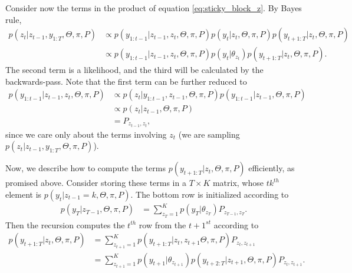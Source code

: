 \documentclass{article}
\begin{document}
Consider now the terms in the product of equation \ref{eq:sticky_block_z}. By
Bayes rule,
\begin{align*}
  p\left(z_{t} \vert z_{t - 1}, y_{1:T}, \Theta, \pi, P\right) &\propto p\left(y_{1:t - 1} \vert z_{t - 1}, z_{t}, \Theta, \pi, P\right)
  p\left(y_{t} \vert z_{t}, \Theta, \pi, P\right)
  p\left(y_{t + 1 : T} \vert z_{t}, \Theta, \pi, P\right) \\
  &\propto p\left(y_{1:t - 1} \vert z_{t - 1}, z_t, \Theta, \pi, P\right) p\left(y_t \vert \theta_{z_t}\right) p\left(y_{t + 1 : T}\vert z_{t}, \Theta, \pi, P\right).
\end{align*}
The second term is a likelihood, and the third will be calculated by the
backwards-pass. Note that the first term can be further reduced to
\begin{align*}
  p\left(y_{1:t - 1} \vert z_{t - 1}, z_t, \Theta, \pi, P\right) &\propto p\left(z_{t} \vert y_{1:t - 1}, z_{t - 1}, \Theta, \pi, P\right)p\left(y_{1:t - 1} \vert z_{t - 1}, \Theta, \pi, P\right) \\
  &\propto p\left(z_{t} \vert z_{t - 1}, \Theta, \pi, P\right) \\
  &= P_{z_{t - 1}, z_{t}},
\end{align*}
since we care only about the terms involving $z_{t}$ (we are sampling
$p\left(z_{t} \vert z_{t - 1}, y_{1:T}, \Theta, \pi, P\right)$).

Now, we describe how to compute the terms $p\left(y_{t + 1:T} \vert z_t, \Theta,
\pi, P\right)$ efficiently, as promised above. Consider storing these terms in a
$T \times K$ matrix, whose $tk^{th}$ element is $p\left(y_{t} \vert z_{t - 1} =
k, \Theta, \pi, P\right)$. The bottom row is initialized according to
\begin{align*}
 p\left(y_T \vert z_{T - 1}, \Theta, \pi, P\right)  &= \sum_{z_{T} = 1}^{K} p\left(y_{T} \vert \theta_{z_{T}}\right) P_{z_{T - 1}, z_{T}}.
\end{align*}
Then the recursion computes the $t^{th}$ row from the $t + 1^{st}$ according to
\begin{align*}
  p\left(y_{t + 1:T} \vert z_t, \Theta, \pi, P\right) &= \sum_{z_{t + 1} = 1}^{K} p\left(y_{t + 1 : T} \vert z_{t}, z_{t + 1} \Theta, \pi, P\right) P_{z_{t}, z_{t + 1}} \\
  &= \sum_{z_{t + 1} = 1}^{K} p\left(y_{t + 1} \vert \theta_{z_{t + 1}}\right) p\left(y_{t + 2 : T} \vert z_{t + 1}, \Theta, \pi, P\right) P_{z_{t}, z_{t + 1}}.
\end{align*}
\end{document}

